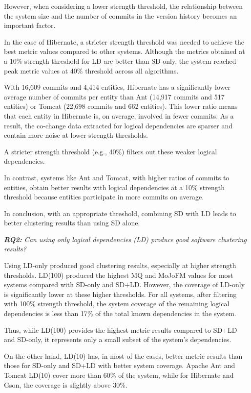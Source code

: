 \documentclass[12pt, a4paper, twoside]{report}
\begin{document}
However, when considering a lower strength threshold, the relationship between the system size and the number of commits in the version history becomes an important factor.

In the case of Hibernate, a stricter strength threshold was needed to achieve the best metric values compared to other systems. Although the metrics obtained at a 10\% strength threshold for LD are better than SD-only, the system reached peak metric values at 40\% threshold across all algorithms.

With 16,609 commits and 4,414 entities, Hibernate has a significantly lower average number of commits per entity than Ant (14,917 commits and 517 entities) or Tomcat (22,698 commits and 662 entities). This lower ratio means that each entity in Hibernate is, on average, involved in fewer commits. As a result, the co-change data extracted for logical dependencies are sparser and contain more noise at lower strength thresholds.

A stricter strength threshold (e.g., 40\%) filters out these weaker logical dependencies.

In contrast, systems like Ant and Tomcat, with higher ratios of commits to entities, obtain better results with logical dependencies at a 10\% strength threshold because entities participate in more commits on average.

In conclusion, with an appropriate threshold, combining SD with LD leads to better clustering results than using SD alone.


\textit{\textbf{RQ2:} Can using only logical dependencies (LD) produce good software clustering results?} 

Using LD-only produced good clustering results, especially at higher strength thresholds. LD(100) produced the highest MQ and MoJoFM values for most systems compared with SD-only and SD+LD. However, the coverage of LD-only is significantly lower at these higher thresholds. For all systems, after filtering with 100\% strength threshold, the system coverage of the remaining logical dependencies is less than 17\% of the total known dependencies in the system.

Thus, while LD(100) provides the highest metric results compared to SD+LD and SD-only, it represents only a small subset of the system's dependencies.

On the other hand, LD(10) has, in most of the cases, better metric results than those for SD-only and SD+LD with better system coverage. Apache Ant and Tomcat LD(10) cover more than 60\% of the system, while for Hibernate and Gson, the coverage is slightly above 30\%. 
\end{document}
